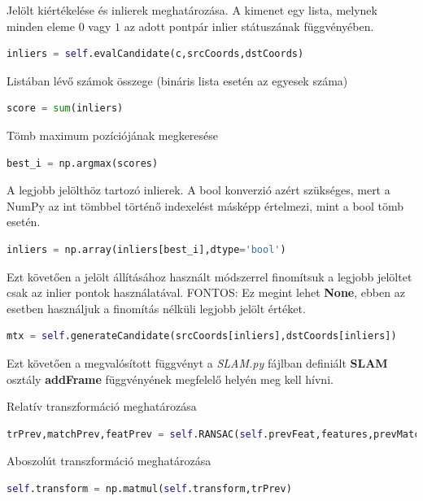 \documentclass[12pt,a4paper,oneside]{report}             %
\begin{document}
Jelölt kiértékelése és inlierek meghatározása. A kimenet egy lista, melynek minden eleme $0$ vagy $1$ az adott pontpár inlier státuszának függvényében.

\begin{lstlisting}[language=Python]
inliers = self.evalCandidate(c,srcCoords,dstCoords)
\end{lstlisting}

Listában lévő számok összege (bináris lista esetén az egyesek száma)
\begin{lstlisting}[language=Python]
score = sum(inliers)
\end{lstlisting}

Tömb maximum pozíciójának megkeresése

\begin{lstlisting}[language=Python]
best_i = np.argmax(scores)
\end{lstlisting}

A legjobb jelölthöz tartozó inlierek. A bool konverzió azért szükséges, mert a NumPy az int tömbbel történő indexelést másképp értelmezi, mint a bool tömb esetén.

\begin{lstlisting}[language=Python]
inliers = np.array(inliers[best_i],dtype='bool')
\end{lstlisting}

Ezt követően a jelölt állításához használt módszerrel finomítsuk a legjobb jelöltet csak az inlier pontok használatával. FONTOS: Ez megint lehet \textbf{None}, ebben az esetben használjuk a finomítás nélküli legjobb jelölt értéket.

\begin{lstlisting}[language=Python]
mtx = self.generateCandidate(srcCoords[inliers],dstCoords[inliers])
\end{lstlisting}

Ezt követően a megvalósított függvényt a \emph{SLAM.py} fájlban definiált \textbf{SLAM} osztály \textbf{addFrame} függvényének megfelelő helyén meg kell hívni.

Relatív transzformáció meghatározása

\begin{lstlisting}[language=Python]
trPrev,matchPrev,featPrev = self.RANSAC(self.prevFeat,features,prevMatch)
\end{lstlisting}

Aboszolút transzformáció meghatározása

\begin{lstlisting}[language=Python]
self.transform = np.matmul(self.transform,trPrev)
\end{lstlisting}
\end{document}

